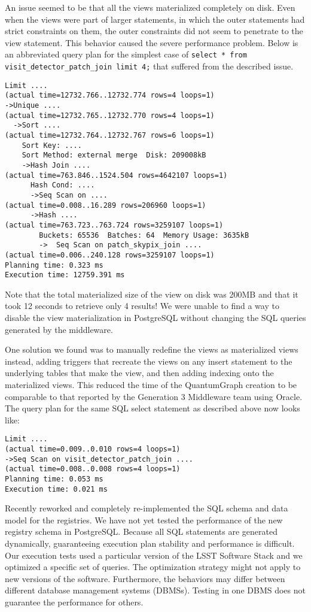 An issue seemed to be that all the views materialized completely on disk.
Even when the views were part of larger statements, in which the outer statements had strict constraints on them, the outer constraints did not seem to penetrate to the view statement.
This behavior caused the severe performance problem.
Below is an abbreviated query plan for the simplest case of \lstinline[basicstyle=\ttfamily]{select * from visit_detector_patch_join limit 4;} that suffered from the described issue.

\begin{lstlisting}[style=sqlprompt]
Limit ....
(actual time=12732.766..12732.774 rows=4 loops=1)
->Unique ....
(actual time=12732.765..12732.770 rows=4 loops=1)
  ->Sort ....
(actual time=12732.764..12732.767 rows=6 loops=1)
    Sort Key: ....
    Sort Method: external merge  Disk: 209008kB
    ->Hash Join ....
(actual time=763.846..1524.504 rows=4642107 loops=1)
      Hash Cond: ....
      ->Seq Scan on ....
(actual time=0.008..16.289 rows=206960 loops=1)
      ->Hash ....
(actual time=763.723..763.724 rows=3259107 loops=1)
        Buckets: 65536  Batches: 64  Memory Usage: 3635kB
        ->  Seq Scan on patch_skypix_join ....
(actual time=0.006..240.128 rows=3259107 loops=1)
Planning time: 0.323 ms
Execution time: 12759.391 ms
\end{lstlisting}

Note that the total materialized size of the view on disk was 200MB and that it took 12 seconds to retrieve only 4 results!
We were unable to find a way to disable the view materialization in PostgreSQL without changing the SQL queries generated by the middleware.

One solution we found was to manually redefine the views as materialized views instead, adding triggers that recreate the views on any insert statement to the underlying tables that make the view, and then adding indexing onto the materialized views.
This reduced the time of the QuantumGraph creation to be comparable to that reported by the Generation 3 Middleware team using Oracle.
The query plan for the same SQL select statement as described above now looks like:

\begin{lstlisting}[style=sqlprompt]
Limit ....
(actual time=0.009..0.010 rows=4 loops=1)
->Seq Scan on visit_detector_patch_join ....
(actual time=0.008..0.008 rows=4 loops=1)
Planning time: 0.053 ms
Execution time: 0.021 ms
\end{lstlisting}

Recently  reworked and completely re-implemented the SQL schema and data model for the registries.
We have not yet tested the performance of the new registry schema in PostgreSQL.
Because all SQL statements are generated dynamically, guaranteeing execution plan stability and performance is difficult.
Our execution tests used a particular version of the LSST Software Stack and we optimized a specific set of queries.
The optimization strategy might not apply to new versions of the software.
Furthermore, the behaviors may differ between different database management systems (DBMSs).
Testing in one DBMS does not guarantee the performance for others.
